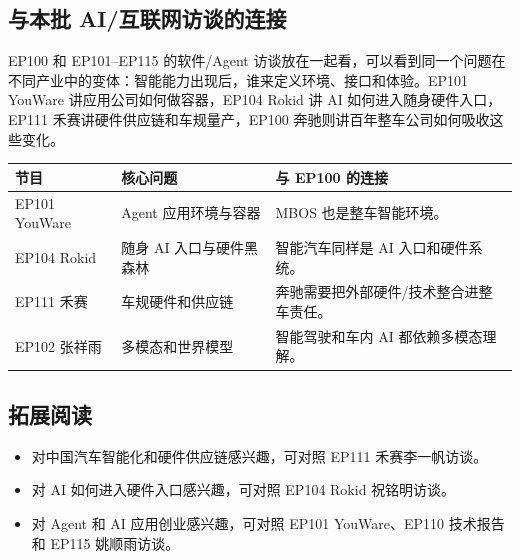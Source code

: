 \documentclass[a4paper]{article}
\begin{document}
\subsection{与本批 AI/互联网访谈的连接}

EP100 和 EP101--EP115 的软件/Agent 访谈放在一起看，可以看到同一个问题在不同产业中的变体：智能能力出现后，谁来定义环境、接口和体验。EP101 YouWare 讲应用公司如何做容器，EP104 Rokid 讲 AI 如何进入随身硬件入口，EP111 禾赛讲硬件供应链和车规量产，EP100 奔驰则讲百年整车公司如何吸收这些变化。

\noindent\begin{tabularx}{\textwidth}{p{}p{}X}
\toprule
节目 & 核心问题 & 与 EP100 的连接 \\
\midrule
EP101 YouWare & Agent 应用环境与容器 & MBOS 也是整车智能环境。 \\
EP104 Rokid & 随身 AI 入口与硬件黑森林 & 智能汽车同样是 AI 入口和硬件系统。 \\
EP111 禾赛 & 车规硬件和供应链 & 奔驰需要把外部硬件/技术整合进整车责任。 \\
EP102 张祥雨 & 多模态和世界模型 & 智能驾驶和车内 AI 都依赖多模态理解。 \\
\bottomrule
\end{tabularx}

\subsection{拓展阅读}

\begin{itemize}
\item 对中国汽车智能化和硬件供应链感兴趣，可对照 EP111 禾赛李一帆访谈。
\item 对 AI 如何进入硬件入口感兴趣，可对照 EP104 Rokid 祝铭明访谈。
\item 对 Agent 和 AI 应用创业感兴趣，可对照 EP101 YouWare、EP110 技术报告和 EP115 姚顺雨访谈。
\end{itemize}
\end{document}
